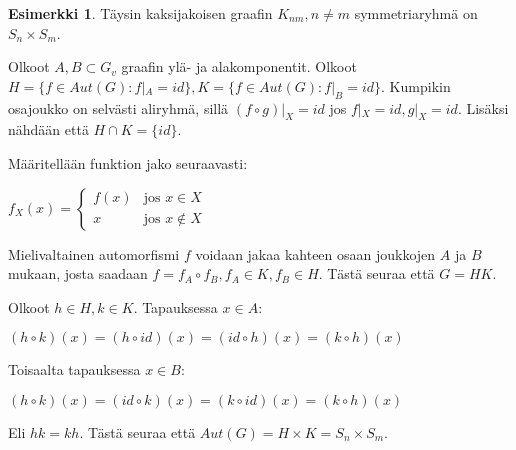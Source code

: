 \documentclass[a4paper, 12pt]{article}
\theoremstyle{definition}
\newtheorem{example}[mydef]{Esimerkki}
\theoremstyle{plain}
\begin{document}
\begin{example}
\label{example:k_nm}
Täysin kaksijakoisen graafin $K_{nm}, n \neq m$ symmetriaryhmä on $S_n \times S_m$.

\begin{center}
\end{center}

Olkoot $A, B \subset G_v$ graafin ylä- ja alakomponentit. Olkoot $H = \{f \in Aut(G) : f|_A = id\}, K = \{f \in Aut(G) : f|_B = id\}$. Kumpikin osajoukko on selvästi aliryhmä, sillä $(f \circ g)|_X = id$ jos $f|_X = id, g|_X = id$. Lisäksi nähdään että $H \cap K = \{ id \}$.

Määritellään funktion jako seuraavasti:

\begin{center}
\begin{math}
f_X(x) =
\left\{
	\begin{array}{ll}
		f(x)  & \mbox{jos } x \in X \\
		x & \mbox{jos } x \notin X
	\end{array}
\right.
\end{math}
\end{center}

Mielivaltainen automorfismi $f$ voidaan jakaa kahteen osaan joukkojen $A$ ja $B$ mukaan, josta saadaan $f = f_A \circ f_B, f_A \in K, f_B \in H$. Tästä seuraa että $G = HK$.

Olkoot $h \in H, k \in K$. Tapauksessa $x \in A$:
\begin{center}
\begin{math}
(h \circ k)(x) = (h \circ id)(x) = (id \circ h)(x) = (k \circ h)(x)
\end{math}
\end{center}
Toisaalta tapauksessa $x \in B$:
\begin{center}
\begin{math}
(h \circ k)(x) = (id \circ k)(x) = (k \circ id)(x) = (k \circ h)(x)
\end{math}
\end{center}

Eli $hk = kh$. Tästä seuraa että $Aut(G) = H \times K = S_n \times S_m$.
\end{example}
\end{document}
